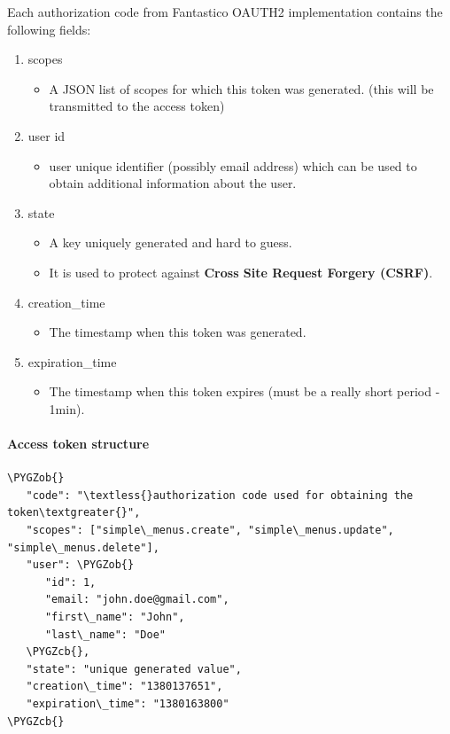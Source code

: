 \documentclass[letterpaper,10pt,english]{sphinxmanual}
\def\PYGZob{\char`\{}
\def\PYGZcb{\char`\}}
\begin{document}
Each authorization code from Fantastico OAUTH2 implementation contains the following fields:
\begin{enumerate}
\item {} 
scopes
\begin{itemize}
\item {} 
A JSON list of scopes for which this token was generated. (this will be transmitted to the access token)

\end{itemize}

\item {} 
user id
\begin{itemize}
\item {} 
user unique identifier (possibly email address) which can be used to obtain additional information about the user.

\end{itemize}

\item {} 
state
\begin{itemize}
\item {} 
A key uniquely generated and hard to guess.

\item {} 
It is used to protect against \textbf{Cross Site Request Forgery (CSRF)}.

\end{itemize}

\item {} 
creation\_time
\begin{itemize}
\item {} 
The timestamp when this token was generated.

\end{itemize}

\item {} 
expiration\_time
\begin{itemize}
\item {} 
The timestamp when this token expires (must be a really short period - 1min).

\end{itemize}

\end{enumerate}


\paragraph{Access token structure}
\label{features/oauth2/tokens_format:access-token-structure}
\begin{Verbatim}[commandchars=\\\{\}]
\PYGZob{}
   "code": "\textless{}authorization code used for obtaining the token\textgreater{}",
   "scopes": ["simple\_menus.create", "simple\_menus.update", "simple\_menus.delete"],
   "user": \PYGZob{}
      "id": 1,
      "email: "john.doe@gmail.com",
      "first\_name": "John",
      "last\_name": "Doe"
   \PYGZcb{},
   "state": "unique generated value",
   "creation\_time": "1380137651",
   "expiration\_time": "1380163800"
\PYGZcb{}
\end{Verbatim}
\end{document}
